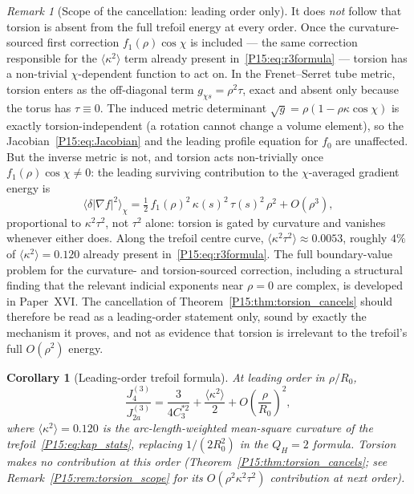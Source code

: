 \documentclass[11pt,a4paper]{article}
\newtheorem{corollary}[theorem]{Corollary}
\theoremstyle{definition}\newtheorem{definition}[theorem]{Definition}
\theoremstyle{remark}
\newtheorem{remark}[theorem]{Remark}
\newcommand{\QH}{Q_H}
\begin{document}
\begin{remark}[Scope of the cancellation: leading order only]
It does \emph{not} follow that torsion is absent from the full
trefoil energy at every order. Once the curvature-sourced first
correction $f_1(\rho)\cos\chi$ is included --- the same correction
responsible for the $\langle\kappa^2\rangle$ term already present
in~\eqref{P15:eq:r3formula} --- torsion has a non-trivial $\chi$-dependent
function to act on. In the Frenet--Serret tube metric, torsion enters
as the off-diagonal term $g_{\chi s}=\rho^2\tau$, exact and absent
only because the torus has $\tau\equiv 0$. The induced metric
determinant $\sqrt{g}=\rho(1-\rho\kappa\cos\chi)$ is exactly
torsion-independent (a rotation cannot change a volume element), so
the Jacobian~\eqref{P15:eq:Jacobian} and the leading profile equation for
$f_0$ are unaffected. But the inverse metric is not, and torsion acts
non-trivially once $f_1(\rho)\cos\chi\neq 0$: the leading surviving
contribution to the $\chi$-averaged gradient energy is
\begin{equation}
  \bigl\langle\delta|\nabla f|^2\bigr\rangle_\chi
  = \tfrac{1}{2}\,f_1(\rho)^2\,\kappa(s)^2\,\tau(s)^2\,\rho^2
  + O(\rho^3),
  \label{P15:eq:torsion_correction}
\end{equation}
proportional to $\kappa^2\tau^2$, not $\tau^2$ alone: torsion is
gated by curvature and vanishes whenever either does. Along the
trefoil centre curve, $\langle\kappa^2\tau^2\rangle\approx 0.0053$,
roughly $4\%$ of $\langle\kappa^2\rangle=0.120$ already present
in~\eqref{P15:eq:r3formula}. The full boundary-value problem for the
curvature- and torsion-sourced correction, including a structural
finding that the relevant indicial exponents near $\rho=0$ are
complex, is developed in Paper~XVI. The cancellation of
Theorem~\ref{P15:thm:torsion_cancels} should therefore be read as a
leading-order statement only, sound by exactly the mechanism it
proves, and not as evidence that torsion is irrelevant to the
trefoil's full $O(\rho^2)$ energy.
\end{remark}

\begin{corollary}[Leading-order trefoil formula]
At leading order in $\rho/R_0$,
\begin{equation}
  \boxed{\frac{J_4^{(3)}}{J_{2a}^{(3)}}
    = \frac{3}{4C_3^{*2}} + \frac{\langle\kappa^2\rangle}{2}
    + O\!\left(\frac{\rho}{R_0}\right)^{\!2},}
  \label{P15:eq:r3formula}
\end{equation}
where $\langle\kappa^2\rangle=0.120$ is the arc-length-weighted
mean-square curvature of the trefoil~\eqref{P15:eq:kap_stats},
replacing $1/(2R_0^2)$ in the $\QH=2$ formula.
Torsion makes no contribution at this order
(Theorem~\ref{P15:thm:torsion_cancels}; see Remark~\ref{P15:rem:torsion_scope}
for its $O(\rho^2\kappa^2\tau^2)$ contribution at next order).
\end{corollary}
\end{document}
